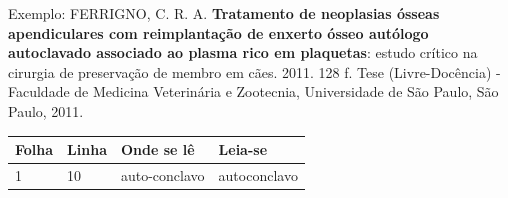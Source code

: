 \documentclass[
	12pt,				%
	openright,			%
	oneside,			%
	a4paper,			%
	english,			%
	french,				%
	spanish,			%
	brazil,sumario=tradicional				%
	]{UFPE-DCP} %
\begin{document}
\begin{fichacatalografica}
	\sffamily
	\vspace*{\fill}					%
	\begin{center}					%
	\end{center}
\end{fichacatalografica}

\begin{errata}

\vspace{\onelineskip}

Exemplo: FERRIGNO, C. R. A. \textbf{Tratamento de neoplasias ósseas apendiculares com
reimplantação de enxerto ósseo autólogo autoclavado associado ao plasma
rico em plaquetas}: estudo crítico na cirurgia de preservação de membro em
cães. 2011. 128 f. Tese (Livre-Docência) - Faculdade de Medicina Veterinária e
Zootecnia, Universidade de São Paulo, São Paulo, 2011.

\begin{table}[htb]
\center
\footnotesize
\begin{tabular}{|p{1.4cm}|p{1cm}|p{3cm}|p{3cm}|}
 \hline
   \textbf{Folha} & \textbf{Linha}  & \textbf{Onde se lê}  & \textbf{Leia-se}  \\
    \hline
    1 & 10 & auto-conclavo & autoconclavo\\
   \hline
\end{tabular}
\end{table}

\end{errata}
\end{document}
